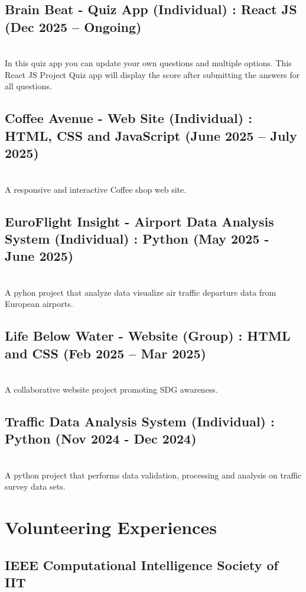 \documentclass[a4paper,10pt]{article}
\begin{document}
\subsection*{Brain Beat - Quiz App (Individual) : React JS \hfill(Dec 2025 – Ongoing)}
\textit{}\\
In this quiz app you can update your own questions and multiple options. This React JS Project Quiz app will display the score after submitting the answers for  all questions.

\subsection*{Coffee Avenue - Web Site (Individual) : HTML, CSS and JavaScript \hfill(June 2025 – July 2025)}
\textit\\
A responsive and interactive Coffee shop web site.

\subsection*{EuroFlight Insight - Airport Data Analysis System (Individual) : Python \hfill(May 2025 - June 2025)}
\textit\\
A pyhon project that analyze data visualize air traffic departure data from European airports.

\subsection*{Life Below Water - Website (Group) : HTML and CSS \hfill(Feb 2025 – Mar 2025)}
\textit\\
A collaborative website project promoting SDG awareness.

\subsection*{Traffic Data Analysis System (Individual) : Python \hfill(Nov 2024 - Dec 2024)}
\textit\\
A python project that performs data validation, processing and analysis on traffic survey data sets.


\section*{\faHandsHelping \; Volunteering Experiences}
\subsection*{IEEE Computational Intelligence Society of IIT}\\
\end{document}
